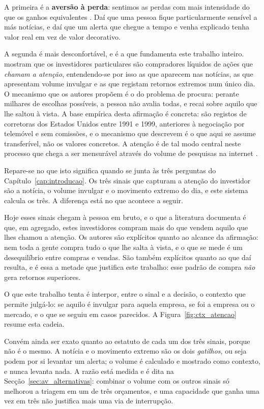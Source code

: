 A primeira é a \textbf{aversão à perda}: sentimos as perdas com mais intensidade do que os ganhos
equivalentes \autocite{kahneman1979prospect}. Daí que uma pessoa fique particularmente sensível a
más notícias, e daí que um alerta que chegue a tempo e venha explicado tenha valor real em vez de
valor decorativo.

A segunda é mais desconfortável, e é a que fundamenta este trabalho inteiro. \textcite{barber2008glitters}
mostram que os investidores particulares são compradores líquidos de
ações que \emph{chamam a atenção}, entendendo-se por isso as que aparecem nas notícias, as que
apresentam volume invulgar e as que registam retornos extremos num único dia. O mecanismo que os
autores propõem é o do problema de procura: perante milhares de escolhas possíveis, a pessoa não
avalia todas, e recai sobre aquilo que lhe saltou à vista. A base empírica desta afirmação é
concreta: são registos de corretoras dos Estados Unidos entre 1991 e 1999, anteriores à negociação por
telemóvel e sem comissões, e o mecanismo que descrevem é o que aqui se assume transferível, não os
valores concretos. A atenção é de tal modo central neste
processo que chega a ser mensurável através do volume de pesquisas na internet
\autocite{da2011attention}.

Repare-se no que isto significa quando se junta às três perguntas do Capítulo~\ref{cap:introducao}.
Os três sinais que capturam a atenção do investidor são a notícia, o volume invulgar e o movimento
extremo do dia, e este sistema calcula os três. A diferença está no que acontece a seguir.

Hoje esses sinais chegam à pessoa em bruto, e o que a literatura documenta é que, em agregado,
estes investidores compram mais do que vendem aquilo que lhes chamou a atenção. Os autores são
explícitos quanto ao alcance da afirmação: nem toda a gente compra tudo o que lhe salta à vista, e
o que se mede é um desequilíbrio entre compras e vendas. São também explícitos quanto ao que daí
resulta, e é essa a metade que justifica este trabalho: esse padrão de compra \emph{não} gera
retornos superiores.

O que este trabalho tenta é interpor, entre o sinal e a decisão, o contexto que permite julgá-lo:
se aquilo é invulgar para aquela empresa, se foi a empresa ou o mercado, e o que se seguiu em casos
parecidos. A Figura~\ref{fig:ctx_atencao} resume esta cadeia.

Convém ainda ser exato quanto ao estatuto de cada um dos três sinais, porque não é o mesmo. A
notícia e o movimento extremo são os dois \emph{gatilhos}, ou seja podem por si levantar um alerta;
o volume é calculado e mostrado como contexto, e nunca levanta nada. A razão está medida e é dita na
Secção~\ref{sec:av_alternativas}: combinar o volume com os outros sinais só melhorou a triagem em um
de três orçamentos, e uma capacidade que ganha uma vez em três não justifica mais uma via de
interrupção.

